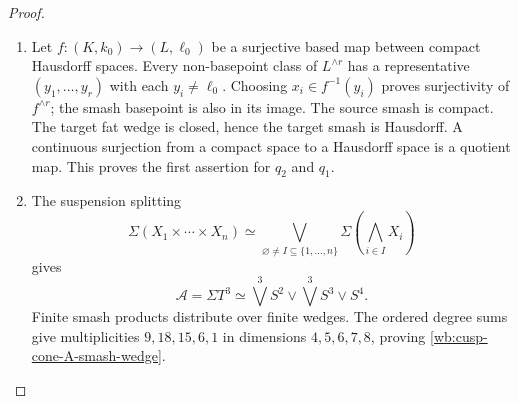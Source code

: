 \begin{proof}
\begin{enumerate}[label=\arabic*.,leftmargin=*]
\item Let \(f:(K,k_0)\to(L,\ell_0)\) be a surjective based map between compact
Hausdorff spaces.  Every non-basepoint class of \(L^{\wedge r}\) has a
representative \((y_1,\ldots,y_r)\) with each \(y_i\ne\ell_0\).  Choosing
\(x_i\in f^{-1}(y_i)\) proves surjectivity of \(f^{\wedge r}\); the smash
basepoint is also in its image.  The source smash is compact.  The target
fat wedge is closed, hence the target smash is Hausdorff.  A continuous
surjection from a compact space to a Hausdorff space is a quotient map.
This proves the first assertion for \(q_2\) and \(q_1\).

\item The suspension splitting
\[
 \Sigma(X_1\times\cdots\times X_n)
 \simeq
 \bigvee_{\varnothing\ne I\subseteq\{1,\ldots,n\}}
 \Sigma\!\left(\bigwedge_{i\in I}X_i\right)
\]
gives
\[
 \mathcal A=\Sigma T^3
 \simeq\bigvee^3S^2\vee\bigvee^3S^3\vee S^4.
\]
Finite smash products distribute over finite wedges.  The ordered degree
sums give multiplicities \(9,18,15,6,1\) in dimensions
\(4,5,6,7,8\), proving \cref{wb:cusp-cone-A-smash-wedge}.


\end{enumerate}
\end{proof}
